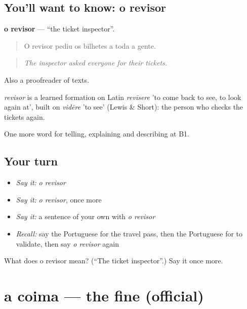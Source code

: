 \subsection*{You'll want to know: o revisor}
\textbf{o revisor} — \textquotedblleft{}the ticket inspector\textquotedblright{}.

\begin{quote}
O revisor pediu os bilhetes a toda a gente.
\end{quote}

\begin{quote}
\emph{The inspector asked everyone for their tickets.}
\end{quote}

Also a proofreader of texts.

\begin{cousinweb}
\emph{revisor} is a learned formation on Latin \emph{revīsere} 'to come back to see, to look again at', built on \emph{vidēre} 'to see' (Lewis \& Short): the person who checks the tickets again.
\end{cousinweb}

\begin{grammarlens}[title={What you've built}]
One more word for telling, explaining and describing at B1.
\end{grammarlens}

\subsection*{Your turn}
\begin{itemize}
\raggedright
  \item \emph{Say it:} \emph{o revisor}
  \item \emph{Say it:} \emph{o revisor}, once more
  \item \emph{Say it:} a sentence of your own with \emph{o revisor}
  \item \emph{Recall:} say the Portuguese for the travel pass, then the Portuguese for to validate, then say \emph{o revisor} again
\end{itemize}

\begin{tcolorbox}[breakable,colback=teal!4,colframe=teal!35!black,title={Before you move on}]
What does o revisor mean? (\textquotedblleft{}The ticket inspector\textquotedblright{}.) Say it once more.
\end{tcolorbox}
\section[a coima]{a coima — the fine (official)}

